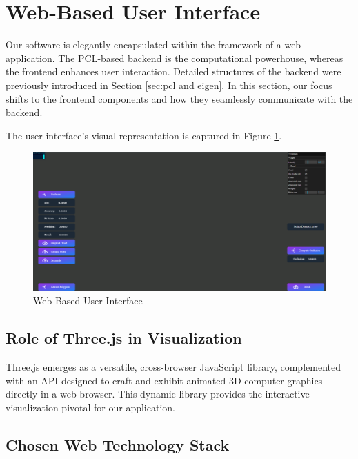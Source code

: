 \documentclass[11pt, a4paper,oneside,chapterprefix=false]{scrbook}
\begin{document}
\section{Web-Based User Interface} \label{sec:three.js}

Our software is elegantly encapsulated within the framework of a web application. The PCL-based backend is the computational powerhouse, whereas the frontend enhances user interaction. Detailed structures of the backend were previously introduced in Section \ref{sec:pcl and eigen}. In this section, our focus shifts to the frontend components and how they seamlessly communicate with the backend.

The user interface's visual representation is captured in Figure \ref{fig:web user interface}.

\begin{figure}[H]
	\centering
	\includegraphics*[width=1.0\textwidth]{figures/ui.png}
	\caption{Web-Based User Interface}
	\label{fig:web user interface}
\end{figure}

\subsection{Role of Three.js in Visualization}

Three.js emerges as a versatile, cross-browser JavaScript library, complemented with an API designed to craft and exhibit animated 3D computer graphics directly in a web browser. This dynamic library provides the interactive visualization pivotal for our application.

\subsection{Chosen Web Technology Stack}
\end{document}
